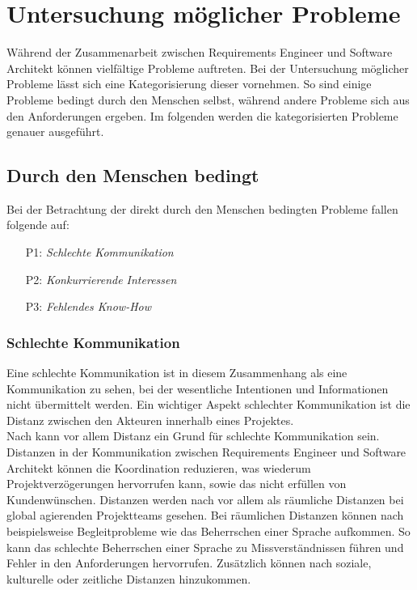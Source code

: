 \section{Untersuchung möglicher Probleme}\label{problem}
W\"ahrend der Zusammenarbeit zwischen Requirements Engineer und Software Architekt k\"onnen vielf\"altige Probleme auftreten. Bei der Untersuchung m\"oglicher Probleme l\"asst sich eine Kategorisierung dieser vornehmen. So sind einige Probleme bedingt durch den Menschen selbst, w\"ahrend andere Probleme sich aus den Anforderungen ergeben. Im folgenden werden die kategorisierten Probleme genauer ausgef\"uhrt. \\

\subsection{Durch den Menschen bedingt}
Bei der Betrachtung der direkt durch den Menschen bedingten Probleme fallen folgende auf:\\

\begin{itemize}
\item[P1:] \textit{Schlechte Kommunikation} 
\item[P2:] \textit{Konkurrierende Interessen}
\item[P3:] \textit{Fehlendes Know-How} \\
\end{itemize}

\subsubsection{Schlechte Kommunikation}
Eine schlechte Kommunikation ist in diesem Zusammenhang als eine Kommunikation zu sehen, bei der wesentliche Intentionen und Informationen nicht \"ubermittelt werden. Ein wichtiger Aspekt schlechter Kommunikation ist die Distanz zwischen den Akteuren innerhalb eines Projektes.\\

Nach \cite{Bja01} kann vor allem Distanz ein Grund f\"ur schlechte Kommunikation sein. Distanzen in der Kommunikation zwischen Requirements Engineer und Software Architekt k\"onnen die Koordination reduzieren, was wiederum Projektverz\"ogerungen hervorrufen kann, sowie das nicht erf\"ullen von Kundenw\"unschen. Distanzen werden nach \cite{Bja01} vor allem als r\"aumliche Distanzen bei global agierenden Projektteams gesehen. Bei r\"aumlichen Distanzen k\"onnen nach \cite{Her01} beispielsweise Begleitprobleme wie das Beherrschen einer Sprache aufkommen. So kann das schlechte Beherrschen einer Sprache zu Missverst\"andnissen f\"uhren und Fehler in den Anforderungen hervorrufen.  Zus\"atzlich k\"onnen nach \cite{Bja01} soziale, kulturelle oder zeitliche Distanzen hinzukommen.\\


